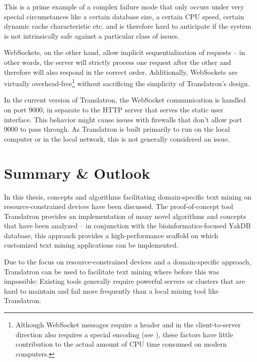 \documentclass[a4paper, 12pt, twoside, reqn]{report}
\numberwithin{figure}{chapter}
\newtheorem[L]{boxedDefinition}{Definition}
\newtheorem[L]{boxedExample}{Example}
\begin{document}
This is a prime example of a complex failure mode that only occurs under very special circumstances like a certain database size, a certain CPU speed, certain dynamic cache characteristic etc. and is therefore hard to anticipate if the system is not intrinsically safe against a particular class of issues.

WebSockets, on the other hand, allow implicit sequentialization of requests -- in other words, the server will strictly process one request after the other and therefore will also respond in the correct order. Additionally, WebSockets are virtually overhead-free\footnote{Although WebSocket messages require a header and in the client-to-server direction also requires a special encoding (see \cite{rfc6955}), these factors have little contribution to the actual amount of CPU time consumed on modern computers.} without sacrificing the simplicity of Translatron's design.

In the current version of Translatron, the WebSocket communication is handled on port 9000, in separate to the HTTP server that serves the static user interface. This behavior might cause issues with firewalls that don't allow port 9000 to pass through. As Translatron is built primarily to run on the local computer or in the local network, this is not generally considered an issue.

\afterpage{\clearpage}


\chapter{Summary \& Outlook}

In this thesis, concepts and algorithms facilitating domain-specific text mining on resource-constrained devices have been discussed.
The proof-of-concept tool Translatron provides an implementation of many novel algorithms and concepts that have been analyzed -- in conjunction with the bioinformatics-focused YakDB database, this approach provides a high-performance scaffold on which customized text mining applications can be implemented.

Due to the focus on resource-constrained devices and a domain-specific approach, Translatron can be used to facilitate text mining where before this was impossible: Existing tools generally require powerful servers or clusters that are hard to maintain and fail more frequently than a local mining tool like Translatron.
\end{document}

